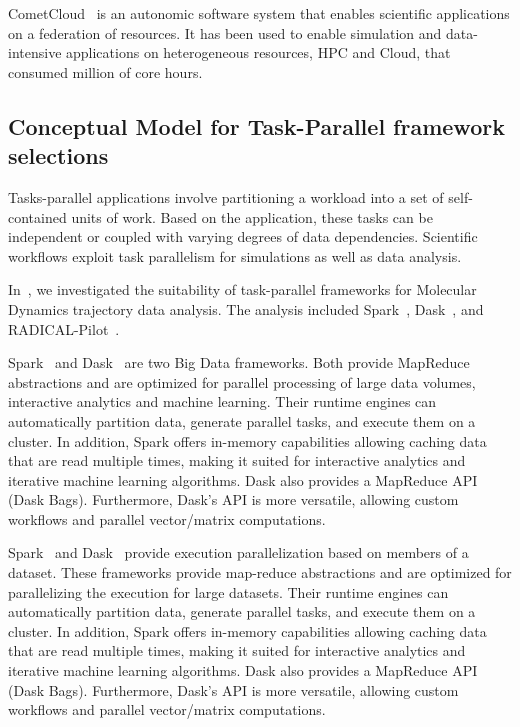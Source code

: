 CometCloud~\cite{diazmontes2015cometcloud} is an autonomic software system that enables scientific applications on a federation of resources. It has been used to enable simulation and data-intensive applications on heterogeneous resources, HPC and Cloud, that consumed million of core hours.

\subsection{Conceptual Model for Task-Parallel framework selections}
Tasks-parallel applications involve partitioning a workload into a set of self-contained units of work. Based on the application, these tasks can be independent or coupled with varying degrees of data dependencies. Scientific workflows exploit task parallelism for simulations as well as data analysis.

In~\cite{paraskevakos2018task}, we investigated the suitability of task-parallel frameworks for Molecular Dynamics trajectory data analysis. The analysis included Spark~\cite{zaharia2010spark}, Dask~\cite{rocklin2015dask}, and RADICAL-Pilot~\cite{merzky2019using}. 

Spark~\cite{zaharia2010spark} and Dask~\cite{rocklin2015dask} are two Big Data frameworks. Both provide MapReduce abstractions and are optimized for parallel processing of large data volumes, interactive analytics and machine learning. Their runtime engines can automatically partition data, generate parallel tasks, and execute them on a cluster. In addition, Spark offers in-memory capabilities allowing caching data that are read multiple times, making it suited for interactive analytics and iterative machine learning algorithms. Dask also provides a MapReduce API (Dask Bags). Furthermore, Dask’s API is more versatile, allowing custom workflows and parallel vector/matrix computations.

Spark~\cite{zaharia2010spark} and Dask~\cite{rocklin2015dask} provide execution parallelization based on members of a dataset. These frameworks provide map-reduce abstractions and are optimized for parallelizing the execution for large datasets. Their runtime engines can automatically partition data, generate parallel tasks, and execute them on a cluster. In addition, Spark offers in-memory capabilities allowing caching data that are read multiple times, making it suited for interactive analytics and iterative machine learning algorithms. Dask also provides a MapReduce API (Dask Bags). Furthermore, Dask’s API is more versatile, allowing custom workflows and parallel vector/matrix computations. 

